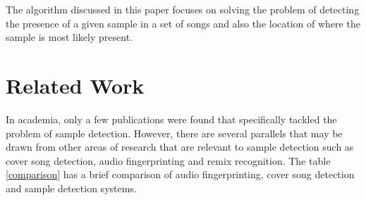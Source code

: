 \documentclass{article}
\begin{document}
The algorithm discussed in this paper focuses on solving the problem of detecting the presence of a given sample in a set of songs and also the location of where the sample is most likely present.

%
\section{Related Work}
\label{related}

In academia, only a few publications were found that specifically tackled the problem of sample detection. However, there are several parallels that may be drawn from other areas of research that are relevant to sample detection such as cover song detection, audio fingerprinting and remix recognition. The table \ref{comparison} has a brief comparison of audio fingerprinting, cover song detection and sample detection systems.
\end{document}
